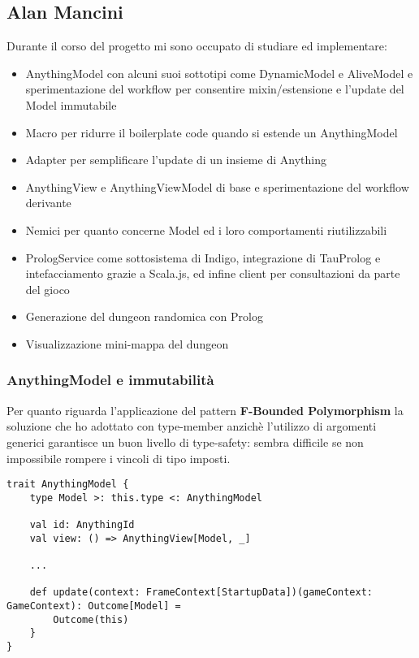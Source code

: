 \subsection{Alan Mancini}
Durante il corso del progetto mi sono occupato di studiare ed implementare:
\begin{itemize}
    \item AnythingModel con alcuni suoi sottotipi come DynamicModel e AliveModel e sperimentazione del workflow per consentire mixin/estensione e l'update del Model immutabile 
    \item Macro per ridurre il boilerplate code quando si estende un AnythingModel
    \item Adapter per semplificare l'update di un insieme di Anything
    \item AnythingView e AnythingViewModel di base e sperimentazione del workflow derivante
    \item Nemici per quanto concerne Model ed i loro comportamenti riutilizzabili
    \item PrologService come sottosistema di Indigo, integrazione di TauProlog e intefacciamento grazie a Scala.js, ed infine client per consultazioni da parte del gioco
    \item Generazione del dungeon randomica con Prolog
    \item Visualizzazione mini-mappa del dungeon
\end{itemize}
\subsubsection{AnythingModel e immutabilità}
Per quanto riguarda l'applicazione del pattern \textbf{F-Bounded Polymorphism} la soluzione che ho adottato con type-member anzichè l'utilizzo di argomenti generici garantisce un buon livello di type-safety: sembra difficile se non impossibile rompere i vincoli di tipo imposti.  

\begin{lstlisting}[basicstyle=\tiny]
trait AnythingModel {
    type Model >: this.type <: AnythingModel
    
    val id: AnythingId
    val view: () => AnythingView[Model, _]

    ...

    def update(context: FrameContext[StartupData])(gameContext: GameContext): Outcome[Model] =
        Outcome(this)
    }
}  
\end{lstlisting}

